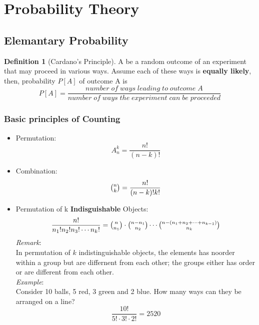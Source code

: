 \documentclass{article}
\theoremstyle{definition}
\newtheorem{definition}{Definition}[subsection]
\begin{document}
\tableofcontents
\section{Probability Theory}
\subsection{Elemantary Probability}
\begin{definition}[Cardano's Principle]
    A be a random outcome of an experiment that may proceed in various ways.
    Assume each of these ways is \textbf{equally likely}, then, probability $P[ A]$ of outcome A is
    \begin{equation}
        P[A] = \frac{number\; of\; ways\; leading\; to\; outcome\; A}{number\; of\; ways\; the\; experiment\; can\; be\; proceeded}
    \end{equation}
\end{definition}
\subsubsection{Basic principles of Counting}
\begin{itemize}
    \item Permutation:
        \begin{equation}
            A_n^k = \frac{n!}{(n-k)!}
        \end{equation}
    \item Combination:
        \begin{equation}
            \tbinom{n}{k}=\frac{n!}{(n-k)!k!}
        \end{equation}
    \item Permutation of k \textbf{Indisguishable} Objects:
        \begin{equation}
            \frac{n!}{n_1!n_2!n_3!\dotsm n_k!}=\tbinom{n}{n_1}\cdot \tbinom{n-n_1}{n_2} \dotsm \tbinom{n-(n_1+n_2 + \dotsm + n_{k-1})}{n_k}
        \end{equation}
        \emph{Remark}:\\ 
        In permutation of $k$ indistinguishable objects, the elements has noorder within a group but are differnent from each other; the groups either has order or are different from each other.\\
        \emph{Example}:\\
        Consider 10 balls, 5 red, 3 green and 2 blue. How many ways can they be arranged on a line?
        \begin{equation}
            \frac{10!}{5! \cdot 3! \cdot 2!} = 2520
        \end{equation}
\end{itemize}
\end{document}
